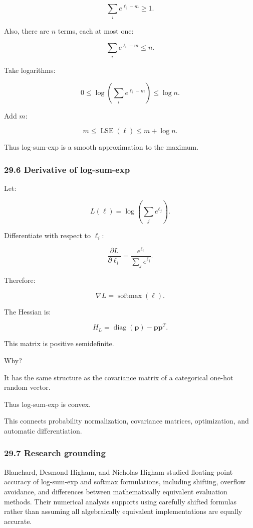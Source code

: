 \[ \sum_ie^{\ell_i-m}\ge1. \]

Also, there are \(n\) terms, each at most one:

\[ \sum_ie^{\ell_i-m}\le n. \]

Take logarithms:

\[ 0\le \log\left(\sum_ie^{\ell_i-m}\right) \le\log n. \]

Add \(m\):

\[ \boxed{ m\le\operatorname{LSE}(\ell)\le m+\log n }. \]

Thus log-sum-exp is a smooth approximation to the maximum.

\subsubsection{29.6 Derivative of log-sum-exp}\label{derivative-of-log-sum-exp}

Let:

\[ L(\ell)=\log\left(\sum_je^{\ell_j}\right). \]

Differentiate with respect to \(\ell_i\):

\[ \frac{\partial L}{\partial\ell_i} = \frac{e^{\ell_i}}{\sum_je^{\ell_j}}. \]

Therefore:

\[ \boxed{ \nabla L=\operatorname{softmax}(\ell) }. \]

The Hessian is:

\[ \boxed{ H_L= \operatorname{diag}(\mathbf p)-\mathbf p\mathbf p^T }. \]

This matrix is positive semidefinite.

Why?

It has the same structure as the covariance matrix of a categorical one-hot random vector.

Thus log-sum-exp is convex.

This connects probability normalization, covariance matrices, optimization, and automatic differentiation.

\subsubsection{29.7 Research grounding}\label{research-grounding}

Blanchard, Desmond Higham, and Nicholas Higham studied floating-point accuracy of log-sum-exp and softmax formulations, including shifting, overflow avoidance, and differences between mathematically equivalent evaluation methods. Their numerical analysis supports using carefully shifted formulas rather than assuming all algebraically equivalent implementations are equally accurate. 


